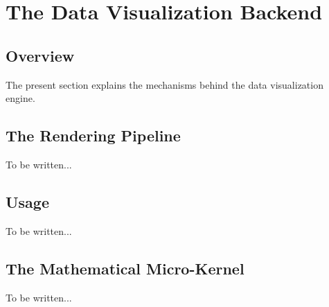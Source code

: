 %
%
%


\section{The Data Visualization Backend}
\label{section-dv-backend}

\subsection{Overview}

The present section explains the mechanisms behind the data
visualization engine. 

\subsection{The Rendering Pipeline}

To be written...

\subsection{Usage}

To be written...

\subsection{The Mathematical Micro-Kernel}

\label{section-dv-math-kernel}
To be written...
